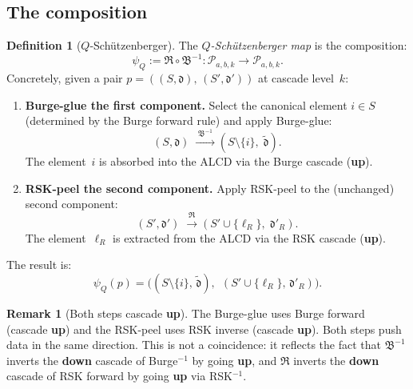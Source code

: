 \documentclass[11pt]{article}
\theoremstyle{plain}
\theoremstyle{definition}
\newtheorem{definition}[theorem]{Definition}
\newtheorem{remark}[theorem]{Remark}
\begin{document}
\subsection{The composition}

\begin{definition}[$Q$-Sch\"utzenberger]
\label{def:Q-schutz}
The \emph{$Q$-Sch\"utzenberger map} is the composition:
\begin{equation}\label{eq:psi-Q}
  \boxed{\;
  \psi_Q := \mathfrak{R} \circ \mathfrak{B}^{-1}
  \colon \mathcal{P}_{a,b,k} \to \mathcal{P}_{a,b,k}.
  \;}
\end{equation}
Concretely, given a pair
$p = ((S, \mathfrak{d}),\, (S', \mathfrak{d}'))$ at cascade
level~$k$:
\begin{enumerate}
  \item \textbf{Burge-glue the first component.}\;
    Select the canonical element $i \in S$ (determined by the
    Burge forward rule) and apply Burge-glue:
    \[
      (S, \mathfrak{d})
      \;\xrightarrow{\;\mathfrak{B}^{-1}\;}
      (S \setminus \{i\},\; \tilde{\mathfrak{d}}).
    \]
    The element~$i$ is absorbed into the ALCD via the Burge
    cascade (\textbf{up}).

  \item \textbf{RSK-peel the second component.}\;
    Apply RSK-peel to the (unchanged) second component:
    \[
      (S', \mathfrak{d}')
      \;\xrightarrow{\;\mathfrak{R}\;}
      (S' \cup \{\ell_R\},\; \mathfrak{d}'_R).
    \]
    The element~$\ell_R$ is extracted from the ALCD via the
    RSK cascade (\textbf{up}).
\end{enumerate}
The result is:
\begin{equation}\label{eq:psi-Q-explicit}
  \psi_Q(p) = \bigl(
    (S \setminus \{i\},\, \tilde{\mathfrak{d}}),\;\,
    (S' \cup \{\ell_R\},\, \mathfrak{d}'_R)
  \bigr).
\end{equation}
\end{definition}

\begin{remark}[Both steps cascade \textbf{up}]
\label{rem:both-up}
The Burge-glue uses Burge forward (cascade \textbf{up}) and
the RSK-peel uses RSK inverse (cascade \textbf{up}).  Both
steps push data in the same direction.  This is not a
coincidence: it reflects the fact that
$\mathfrak{B}^{-1}$ inverts the \textbf{down} cascade of
Burge$^{-1}$ by going \textbf{up}, and $\mathfrak{R}$ inverts
the \textbf{down} cascade of RSK forward by going \textbf{up}
via RSK$^{-1}$.
\end{remark}
\end{document}
